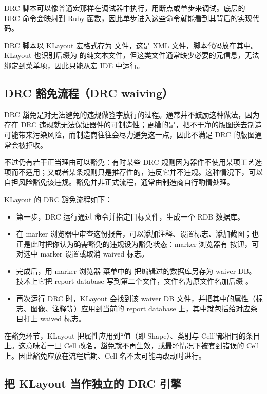 DRC 脚本可以像普通宏那样在调试器中执行，用断点或单步来调试。底层的 DRC 命令会映射到 Ruby 函数，因此单步进入这些命令就能看到其背后的实现代码。

DRC 脚本以 KLayout 宏格式存为  文件，这是 XML 文件，脚本代码放在其中。KLayout 也识别后缀为  的纯文本文件，但这类文件通常缺少必要的元信息，无法绑定到菜单项，因此只能从宏 IDE 中运行。

\subsection{DRC 豁免流程（DRC waiving）}

DRC 豁免是对无法避免的违规做签字放行的过程。通常并不鼓励这种做法，因为存在 DRC 违规就无法保证器件的可制造性；更糟的是，把不干净的版图送去制造可能带来污染风险，而制造商往往会尽力避免这一点，因此不满足 DRC 的版图通常会被拒收。

不过仍有若干正当理由可以豁免：有时某些 DRC 规则因为器件不使用某项工艺选项而不适用；又或者某条规则只是推荐性的，违反它并不违规。这种情况下，可以自担风险豁免该违规。豁免并非正式流程，通常由制造商自行酌情处理。

KLayout 的 DRC 豁免流程如下：

\begin{itemize}
\item 第一步，DRC 运行通过  命令并指定目标文件，生成一个 RDB 数据库。
\item 在 marker 浏览器中审查这份报告，可以添加注释、设置标志、添加截图；也正是此时把你认为确需豁免的违规设为豁免状态：marker 浏览器有  按钮，可对选中 marker 设置或取消 waived 标志。
\item 完成后，用 marker 浏览器  菜单中的  把编辑过的数据库另存为 waiver DB。技术上它把 report database 写到第二个文件，文件名为原文件名加后缀 。
\item 再次运行 DRC 时，KLayout 会找到该 waiver DB 文件，并把其中的属性（标志、图像、注释等）应用到当前的 report database 上，其中就包括给对应条目打上 waived 标志。
\end{itemize}

在豁免环节，KLayout 把属性应用到“值（即 Shape）、类别与 Cell”都相同的条目上。这意味着一旦 Cell 改名，豁免就不再生效，或最坏情况下被套到错误的 Cell 上。因此豁免应放在流程后期、Cell 名不太可能再改动时进行。

\subsection{把 KLayout 当作独立的 DRC 引擎}

